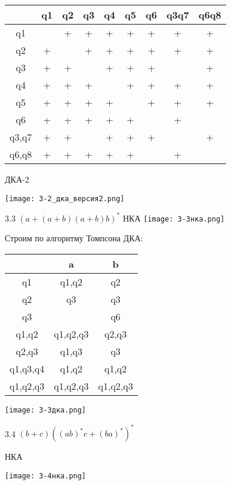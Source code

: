 \documentclass{article}
\begin{document}
\begin{tabular}{ | c | c | c | c | c | c | c | c | c | }
\hline
& q1 & q2 & q3 & q4 & q5 & q6 & q3q7 & q6q8 \\ \hline
q1 & & + & + & + & + & + & + & + \\ \hline
q2 & + & & + & + & + & + & + & + \\ \hline
q3 & + & + & & + & + & + & & + \\ \hline
q4 & + & + & + & & + & + & + & + \\ \hline
q5 & + & + & + & + & & + & + & + \\ \hline
q6 & + & + & + & + & + & & + & \\ \hline
q3,q7 & + & + & & + & + & + & & + \\ \hline
q6,q8 & + & + & + & + & + & & + & \\ \hline
\end{tabular}

\newpage

ДКА-2

\texttt{[image: 3-2\_дка\_версия2.png]}

\newpage

3.3 \((a + (a + b)(a + b)b)^*\)
\newline
НКА
\texttt{[image: 3-3нка.png]}

Строим по алгоритму Томпсона ДКА:

\begin{tabular}{ | c | c | c | }
\hline
& a & b \\ \hline
q1 & q1,q2 & q2 \\ \hline
q2 & q3 & q3 \\ \hline
q3 & & q6 \\ \hline
q1,q2 & q1,q2,q3 & q2,q3 \\ \hline
q2,q3 & q1,q3 & q3 \\ \hline
q1,q3,q4 & q1,q2 & q1,q2 \\ \hline
q1,q2,q3 & q1,q2,q3 & q1,q2,q3 \\ \hline
\end{tabular}

\texttt{[image: 3-3дка.png]}

\newpage

3.4 \((b + c)((ab)^*c + (ba)^*)^*\)

\newline

НКА

\texttt{[image: 3-4нка.png]}
\end{document}
